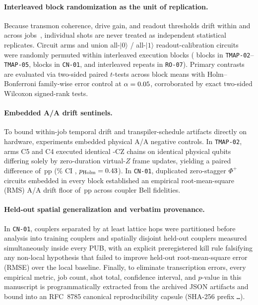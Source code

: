 \documentclass[twocolumn,aps,prapplied,superscriptaddress,floatfix]{revtex4-2}
\begin{document}
\paragraph{Interleaved block randomization as the unit of replication.} Because transmon coherence, drive gain, and readout thresholds drift within and across jobs~\cite{proctor2020}, individual shots are never treated as independent statistical replicates. Circuit arms and union all-$|0\rangle$ / all-$|1\rangle$ readout-calibration circuits were randomly permuted within interleaved execution blocks (\TmapBlocks{} blocks in \texttt{TMAP-02}--\texttt{TMAP-05}, \CnBlocks{} blocks in \texttt{CN-01}, and \RoSevenRepeats{} interleaved repeats in \texttt{RO-07}). Primary contrasts are evaluated via two-sided paired $t$-tests across block means with Holm--Bonferroni family-wise error control at $\alpha=0.05$, corroborated by exact two-sided Wilcoxon signed-rank tests.

\paragraph{Embedded A/A drift sentinels.} To bound within-job temporal drift and transpiler-schedule artifacts directly on hardware, experiments embedded physical A/A negative controls. In \texttt{TMAP-02}, arms C5 and C4 executed identical \TmapChainCz{}-CZ chains on identical physical qubits differing solely by zero-duration virtual-$Z$ frame updates, yielding a paired difference of \TmapTwoAaVirtualZPp\,pp (\CiLevelPct\% CI \TmapTwoAaVirtualZCi, $p_{\mathrm{Holm}}=0.43$). In \texttt{CN-01}, duplicated zero-stagger $\Phi^+$ circuits embedded in every block established an empirical root-mean-square (RMS) A/A drift floor of \CnAaRmsRawPp\,pp across coupler Bell fidelities.

\paragraph{Held-out spatial generalization and verbatim provenance.} In \texttt{CN-01}, \CnTotalCouplers{} couplers separated by at least \CnMinHops{} lattice hops were partitioned before analysis into \CnTrainCouplers{} training couplers and \CnHeldOutCouplers{} spatially disjoint held-out couplers measured simultaneously inside every PUB, with an explicit preregistered kill rule falsifying any non-local hypothesis that failed to improve held-out root-mean-square error (RMSE) over the local baseline. Finally, to eliminate transcription errors, every empirical metric, job count, shot total, confidence interval, and $p$-value in this manuscript is programmatically extracted from the \CapsuleSourceCount{} archived JSON artifacts and bound into an RFC~8785 canonical reproducibility capsule (SHA-256 prefix \texttt{\CapsuleRfcShaPrefix\ldots}).
\end{document}
